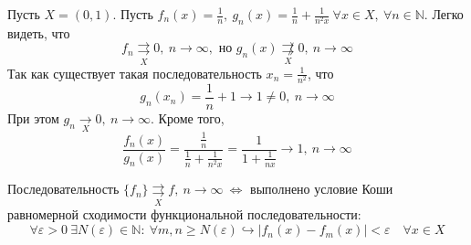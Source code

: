 \documentclass[11pt]{article}
\begin{document}
\begin{example}
    Пусть $X = (0, 1)$. Пусть $\displaystyle f_n(x) = \frac{1}{n}, \ g_n(x) = \frac{1}{n} + \frac{1}{n^2 x} \ \forall x \in X, \ \forall n \in \mathbb{N}$. Легко видеть,
    что \[f_n \underset{X}{\rightrightarrows} 0, \ n \to \infty, \text{ но } g_n(x) \underset{X}{\not\rightrightarrows} 0, \ n \to \infty\] Так как существует такая 
    последовательность $\displaystyle x_n = \frac{1}{n^2}$, что \[g_n(x_n) = \frac{1}{n} + 1 \to 1 \neq 0, \ n \to \infty\] При этом $g_n \underset{X}{\rightarrow} 0, \ 
    n \to \infty$. Кроме того, \[\frac{f_n(x)}{g_n(x)} = \frac{\displaystyle \frac{1}{n}}{\displaystyle \frac{1}{n} + \frac{1}{n^2 x}} = \frac{1}{\displaystyle 1 + \frac{1}{nx}} \to 1, \ n \to \infty\]
\end{example}

\begin{theorem}
    Последовательность $\{f_n\} \underset{X}{\rightrightarrows} f, \ n \to \infty \ \Longleftrightarrow$ выполнено условие Коши равномерной сходимости функциональной последовательности:
    \[\forall \varepsilon > 0 \ \exists N(\varepsilon) \in \mathbb{N}: \ \forall m, n \geq N(\varepsilon) \hookrightarrow |f_n(x) - f_m(x)| < \varepsilon \quad \forall x \in X \label{eq:star2} \tag{*}\] 
\end{theorem}
\end{document}
